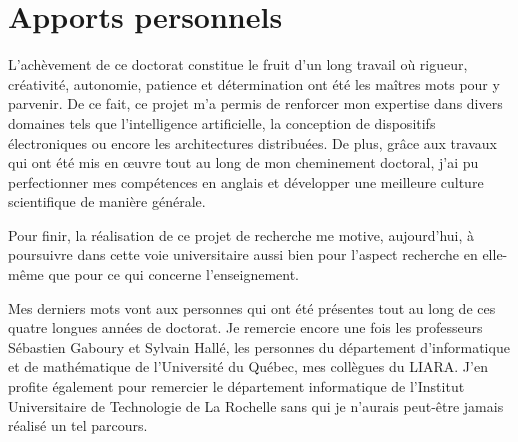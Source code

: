 \section{Apports personnels}

L'achèvement de ce doctorat constitue le fruit d'un long travail où rigueur, créativité, autonomie, patience et détermination ont été les maîtres mots pour y parvenir. De ce fait, ce projet m'a permis de renforcer mon expertise dans divers domaines tels que l'intelligence artificielle, la conception de dispositifs électroniques ou encore les architectures distribuées. De plus, grâce aux travaux qui ont été mis en \oe{}uvre tout au long de mon cheminement doctoral, j'ai pu perfectionner mes compétences en anglais et développer une meilleure culture scientifique de manière générale.

Pour finir, la réalisation de ce projet de recherche me motive, aujourd'hui, à poursuivre dans cette voie universitaire aussi bien pour l'aspect recherche en elle-même que pour ce qui concerne l'enseignement.

Mes derniers mots vont aux personnes qui ont été présentes tout au long de ces quatre longues années de doctorat. Je remercie encore une fois les professeurs Sébastien Gaboury et Sylvain Hallé, les personnes du département d'informatique et de mathématique de l'Université du Québec, mes collègues du \acs{LIARA}. J'en profite également pour remercier le département informatique de l'Institut Universitaire de Technologie de La Rochelle sans qui je n'aurais peut-être jamais réalisé un tel parcours.
